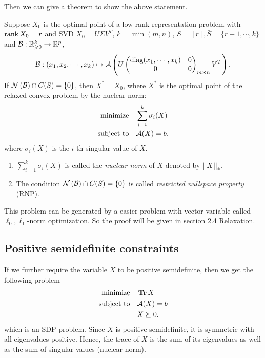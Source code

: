 \documentclass[11pt]{article}
\begin{document}
\begin{problem}
Then we can give a theorem to show the above statement.

\begin{theorem}
    Suppose \(X_0\) is the optimal point of a low rank representation problem with \(\operatorname{rank} X_0=r\) and SVD \(X_0 = U\Sigma V^T\), \(k=\min(m,n)\), \(S=[r],\bar{S}=\{r+1,\cdots ,k\}\) and \(\mathcal{B}:\mathbb R^k_{\geqslant 0} \to \mathbb R^p\),
    \[\mathcal{B}:(x_1,x_2,\cdots,x_k) \mapsto \mathcal{A}\left( U \begin{pmatrix}
        \operatorname{diag}(x_1,\cdots,x_k) & 0 \\
        0 & 0
    \end{pmatrix}_{m\times n} V^T\right).\]
    If \(\mathcal N\left(\mathcal{B}\right)\cap C(S) = \{0\}\), then \(X^\ast=X_0\), where \(X^\ast\) is the optimal point of the relaxed convex problem by the nuclear norm: 
    \[\begin{aligned}
        \textnormal{minimize}\quad & \sum_{i=1}^k\sigma_i(X)\\
        \textnormal{subject to}\quad & \mathcal A(X)=b.
    \end{aligned}\]
    where \(\sigma_i(X)\) is the \(i\)-th singular value of \(X\).
\end{theorem}

\begin{remark}
    \begin{enumerate}[(1)]
        \item \(\sum_{i=1}^{k} \sigma_i(X)\) is called the \emph{nuclear norm} of \(X\) denoted by \(\left|\left|X\right|\right|_\ast\).
        \item The condition \(\mathcal N\left(\mathcal{B}\right)\cap C(S) = \{0\}\) is called \emph{restricted nullspace property} (RNP).
    \end{enumerate}
\end{remark}

This problem can be generated by a easier problem with vector variable called \(\ell_0,\ell_1\)-norm optimization. So the proof will be given in section 2.4 Relaxation.

\subsection{Positive semidefinite constraints}

If we further require the variable \(X\) to be positive semidefinite, then we get the following problem 
\[\begin{aligned}
    \textnormal{minimize}\quad & \operatorname{\mathbf{Tr}} X\\
    \textnormal{subject to}\quad & \mathcal A(X)=b\\
    & X\succeq 0.
\end{aligned}\]
which is an SDP problem. Since \(X\) is positive semidefinite, it is symmetric with all eigenvalues positive. Hence, the trace of \(X\) is the sum of its eigenvalues as well as the sum of singular values (nuclear norm).


\end{problem}
\end{document}
